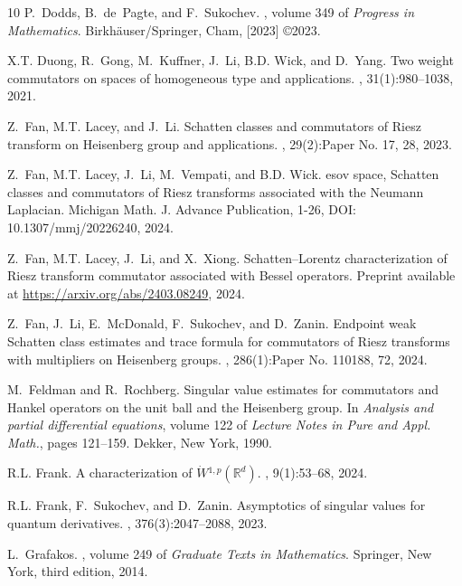 \documentclass[12pt]{amsart}
\begin{document}
\begin{thebibliography}{10}
P.~Dodds, B.~de~Pagte, and F.~Sukochev.
, volume 349 of
  {\em Progress in Mathematics}.
\newblock Birkh\"{a}user/Springer, Cham, [2023] \copyright 2023.

X.T. Duong, R.~Gong, M.~Kuffner, J.~Li, B.D. Wick, and D.~Yang.
\newblock Two weight commutators on spaces of homogeneous type and
  applications.
, 31(1):980--1038, 2021.

Z.~Fan, M.T. Lacey, and J.~Li.
\newblock Schatten classes and commutators of {R}iesz transform on {H}eisenberg
  group and applications.
, 29(2):Paper No. 17, 28, 2023.

Z.~Fan, M.T. Lacey, J.~Li, M.~Vempati, and B.D. Wick.
esov space, {S}chatten classes and commutators of {R}iesz
  transforms associated with the {N}eumann {L}aplacian.
\newblock Michigan Math. J. Advance Publication, 1-26, DOI:
  10.1307/mmj/20226240, 2024.

Z.~Fan, M.T. Lacey, J.~Li, and X.~Xiong.
\newblock Schatten--{L}orentz characterization of {R}iesz transform commutator
  associated with {B}essel operators.
\newblock Preprint available at \url{https://arxiv.org/abs/2403.08249}, 2024.

Z.~Fan, J.~Li, E.~McDonald, F.~Sukochev, and D.~Zanin.
\newblock Endpoint weak {S}chatten class estimates and trace formula for
  commutators of {R}iesz transforms with multipliers on {H}eisenberg groups.
, 286(1):Paper No. 110188, 72, 2024.

M.~Feldman and R.~Rochberg.
\newblock Singular value estimates for commutators and {H}ankel operators on
  the unit ball and the {H}eisenberg group.
\newblock In {\em Analysis and partial differential equations}, volume 122 of
  {\em Lecture Notes in Pure and Appl. Math.}, pages 121--159. Dekker, New
  York, 1990.

R.L. Frank.
\newblock A characterization of {$\dot W{}^{1,p}(\mathbb{R}^d)$}.
, 9(1):53--68, 2024.

R.L. Frank, F.~Sukochev, and D.~Zanin.
\newblock Asymptotics of singular values for quantum derivatives.
, 376(3):2047--2088, 2023.

L.~Grafakos.
, volume 249 of {\em Graduate Texts
  in Mathematics}.
\newblock Springer, New York, third edition, 2014.


\end{thebibliography}
\end{document}
